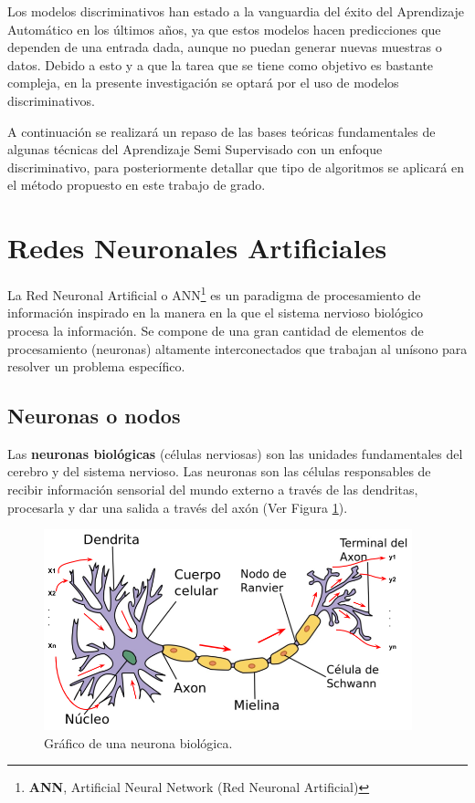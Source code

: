 Los modelos discriminativos han estado a la vanguardia del éxito del Aprendizaje Automático en los \'{u}ltimos a\~{n}os, ya que estos modelos hacen predicciones que dependen de una entrada dada, aunque no puedan generar nuevas muestras o datos. Debido a esto y a que la tarea que se tiene como objetivo es bastante compleja, en la presente investigaci\'{o}n se optar\'{a} por el uso de modelos discriminativos. 

\vspace{5mm} %

A continuaci\'{o}n se realizar\'{a} un repaso de las bases te\'{o}ricas fundamentales de algunas t\'{e}cnicas del Aprendizaje Semi Supervisado con un enfoque discriminativo, para posteriormente detallar que tipo de algoritmos se aplicar\'{a} en el m\'{e}todo propuesto en este trabajo de grado.

\section{Redes Neuronales Artificiales}

La Red Neuronal Artificial o ANN\footnote{\textbf{ANN}, Artificial Neural Network (Red Neuronal Artificial)} es un paradigma de procesamiento de informaci\'{o}n inspirado en la manera en la que el sistema nervioso biol\'{o}gico procesa la informaci\'{o}n. Se compone de una gran cantidad de elementos de procesamiento (neuronas) altamente interconectados que trabajan al un\'{i}sono para resolver un problema espec\'{i}fico.

\subsection{Neuronas o nodos}

Las \textbf{neuronas biol\'{o}gicas} (c\'{e}lulas nerviosas) son las unidades fundamentales del cerebro y del sistema nervioso. Las neuronas son las c\'{e}lulas responsables de recibir informaci\'{o}n sensorial del mundo externo a trav\'{e}s de las dendritas, procesarla y dar una salida a trav\'{e}s del ax\'{o}n (Ver Figura \ref{fig:neurona}). 

 \begin{figure}[h!]
  \begin{center}	\includegraphics[width=0.95\textwidth]{imagenes/Cap4/neurona}
  \caption{Gr\'{a}fico de una neurona biol\'{o}gica.}
  \label{fig:neurona}
  \end{center}
\end{figure}

